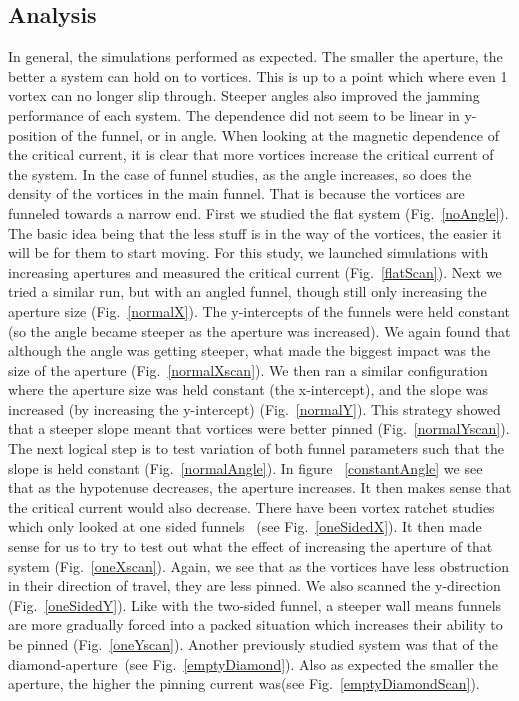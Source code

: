 \subsection{Analysis}
In general, the simulations performed as expected. The smaller the aperture, the better a system can hold on to vortices. This is up to a point which where even 1 vortex can no longer slip through. Steeper angles also improved the jamming performance of each system. The dependence did not seem to be linear in y-position of the funnel, or in angle. When looking at the magnetic dependence of the critical current, it is clear that more vortices increase the critical current of the system. In the case of funnel studies, as the angle increases, so does the density of the vortices in the main funnel. That is because the vortices are funneled towards a narrow end. First we studied the flat system (Fig.~\ref{noAngle}). The basic idea being that the less stuff is in the way of the vortices, the easier it will be for them to start moving. For this study, we launched simulations with increasing apertures and measured the critical current (Fig.~\ref{flatScan}). Next we tried a similar run, but with an angled funnel, though still only increasing the aperture size (Fig.~\ref{normalX}). The y-intercepts of the funnels were held constant (so the angle became steeper as the aperture was increased). We again found that although the angle was getting steeper, what made the biggest impact was the size of the aperture (Fig.~\ref{normalXscan}). We then ran a similar configuration where the aperture size was held constant (the x-intercept), and the slope was increased (by increasing the y-intercept) (Fig.~\ref{normalY}). This strategy showed that a steeper slope meant that vortices were better pinned (Fig.~\ref{normalYscan}). The next logical step is to test variation of both funnel parameters such that the slope is held constant (Fig.~\ref{normalAngle}). In figure ~\ref{constantAngle} we see that as the hypotenuse decreases, the aperture increases. It then makes sense that the critical current would also decrease. There have been vortex ratchet studies which only looked at one sided funnels~\cite{Plourde09} (see Fig.~\ref{oneSidedX}). It then made sense for us to try to test out what the effect of increasing the aperture of that system (Fig.~\ref{oneXscan}). Again, we see that as the vortices have less obstruction in their direction of travel, they are less pinned. We also scanned the y-direction (Fig.~\ref{oneSidedY}). Like with the two-sided funnel, a steeper wall means funnels are more gradually forced into a packed situation which increases their ability to be pinned (Fig.~\ref{oneYscan}).  Another previously studied system was that of the diamond-aperture~\cite{Lu06}(see Fig.~\ref{emptyDiamond}). Also as expected the smaller the aperture, the higher the pinning current was(see Fig.~\ref{emptyDiamondScan}).  

